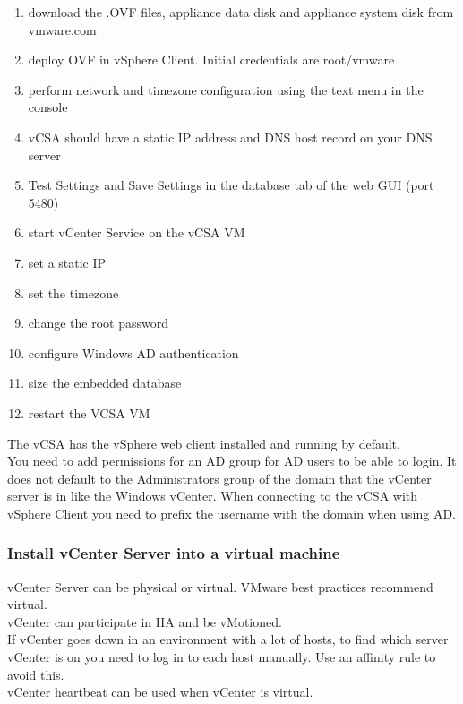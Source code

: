 \begin{enumerate}
\item download the .OVF files, appliance data disk and appliance system disk from vmware.com
\item deploy OVF in vSphere Client. Initial credentials are root/vmware
\item perform network and timezone configuration using the text menu in the console
\item vCSA should have a static IP address and DNS host record on your DNS server
\item Test Settings and Save Settings in the database tab of the web GUI (port 5480)
\item start vCenter Service on the vCSA VM
\item set a static IP
\item set the timezone
\item change the root password
\item configure Windows AD authentication
\item size the embedded database
\item restart the VCSA VM
\end{enumerate}

The vCSA has the vSphere web client installed and running by default.\\

You need to add permissions for an AD group for AD users to be able to login. It does not
default to the Administrators group of the domain that the vCenter server is in like the Windows
vCenter. When connecting to the vCSA with vSphere Client you need to prefix the username with
the domain when using AD.

\subsubsection{Install vCenter Server into a virtual machine}

vCenter Server can be physical or virtual. VMware best practices recommend virtual.\\

vCenter can participate in HA and be vMotioned.\\

If vCenter goes down in an environment with a lot of hosts, to find which server vCenter
is on you need to log in to each host manually. Use an affinity rule to avoid this.\\

vCenter heartbeat can be used when vCenter is virtual.\\

